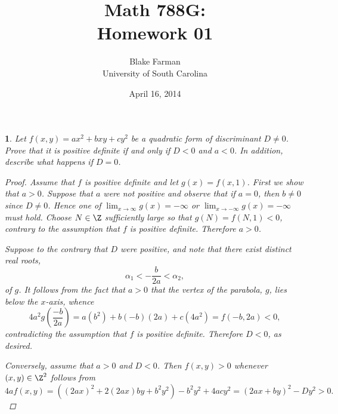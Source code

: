 \documentclass[10pt]{amsart}
\author{Blake Farman\\University of South Carolina}
\title{Math 788G:\\Homework 01}
\date{April 16, 2014}
\begin{document}
\maketitle

\providecommand{\p}{\mathfrak{p}}
\providecommand{\m}{\mathfrak{m}}
\providecommand{\Deck}[1]{\operatorname{Deck}\left(#1\right)}
\newtheorem{thm}{}
\newtheorem{lem}{Lemma}
\newtheorem{prop}{Proposition}
\theoremstyle{definition}
\newtheorem{defn}{Definition}[thm]

\newcommand{\A}{\mathbb{A}}

\begin{thm}\label{Ex1}
  Let $f(x,y) = ax^2 + bxy + cy^2$ be a quadratic form of discriminant $D \neq 0$.
  Prove that it is positive definite if and only if $D < 0$ and $a < 0$.
  In addition, describe what happens if $D = 0$.

  \begin{proof}
    Assume that $f$ is positive definite and let $g(x) = f(x,1)$.
    First we show that $a > 0$.
    Suppose that $a$ were not positive and observe that if $a = 0$, then $b \neq 0$ since $D \neq 0$.
    Hence one of $\lim_{x \rightarrow \infty}g(x) = -\infty$ or $\lim_{x \rightarrow -\infty}g(x) = -\infty$ must hold.
    Choose $N \in \Z$ sufficiently large so that $g(N) = f(N,1) < 0$, contrary to the assumption that $f$ is positive definite.
    Therefore $a > 0$.
    
    Suppose to the contrary that $D$ were positive, and note that there exist distinct real roots, 
    $$\alpha_1 <  -\frac{b}{2a} < \alpha_2,$$
    of $g$.
    It follows from the fact that $a > 0$ that the vertex of the parabola, $g$, lies below the $x$-axis, whence
    $$4a^2g\left(\frac{-b}{2a}\right) = a(b^2) + b(-b)(2a) + c(4a^2) = f(-b, 2a) < 0,$$
    contradicting the assumption that $f$ is positive definite.
    Therefore $D < 0$, as desired.

    Conversely, assume that $a > 0$ and $D < 0$.		
    Then $f(x,y) > 0$ whenever $(x,y) \in \Z^2$ follows from
    $$4af(x,y) = \left((2ax)^2 + 2(2ax)by + b^2y^2\right) - b^2y^2 + 4acy^2 = (2ax + by)^2 - Dy^2 > 0.$$
  \end{proof}
\end{thm}
\end{document}
